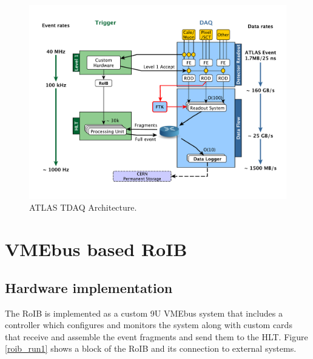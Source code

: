 \documentclass{JINST}
\begin{document}
\begin{figure}[tbp] %
\centering
\includegraphics[width=.9\textwidth]{figures/tdaqFullNew2015}
\caption{ATLAS TDAQ Architecture.}
\label{fig:atlas_tdaq}
\end{figure}







\section{VMEbus based RoIB}\label{sec:roib}

\subsection{Hardware implementation}\label{sec:roib_current}

The RoIB is implemented as a custom 9U VMEbus system that includes a controller which configures and monitors the system along with custom cards 
that receive and assemble the event fragments and send them to the HLT. Figure \ref{roib_run1} shows a block of the RoIB and 
its connection to external systems.
\end{document}
